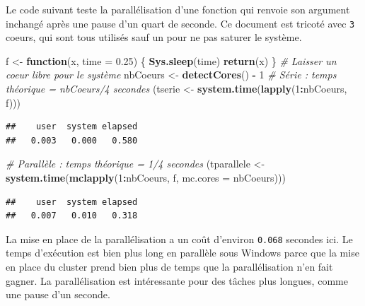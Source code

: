 \documentclass[
  12pt,
  french,
  a4paper,
  extrafontsizes,onecolumn,openright
  ]{memoir}
\newenvironment{Shaded}{\begin{snugshade}}{\end{snugshade}}
\newcommand{\CommentTok}[1]{\textcolor[rgb]{0.56,0.35,0.01}{\textit{#1}}}
\newcommand{\ControlFlowTok}[1]{\textcolor[rgb]{0.13,0.29,0.53}{\textbf{#1}}}
\newcommand{\DataTypeTok}[1]{\textcolor[rgb]{0.13,0.29,0.53}{#1}}
\newcommand{\DecValTok}[1]{\textcolor[rgb]{0.00,0.00,0.81}{#1}}
\newcommand{\FloatTok}[1]{\textcolor[rgb]{0.00,0.00,0.81}{#1}}
\newcommand{\KeywordTok}[1]{\textcolor[rgb]{0.13,0.29,0.53}{\textbf{#1}}}
\newcommand{\NormalTok}[1]{#1}
\newcommand{\OperatorTok}[1]{\textcolor[rgb]{0.81,0.36,0.00}{\textbf{#1}}}
\newcommand{\StringTok}[1]{\textcolor[rgb]{0.31,0.60,0.02}{#1}}
\begin{document}
\normalsize

Le code suivant teste la parallélisation d'une fonction qui renvoie son argument inchangé après une pause d'un quart de seconde.
Ce document est tricoté avec \texttt{3} coeurs, qui sont tous utilisés sauf un pour ne pas saturer le système.

\scriptsize

\begin{Shaded}
\begin{Highlighting}[]
\NormalTok{f <-}\StringTok{ }\ControlFlowTok{function}\NormalTok{(x, }\DataTypeTok{time =} \FloatTok{0.25}\NormalTok{) \{}
    \KeywordTok{Sys.sleep}\NormalTok{(time)}
    \KeywordTok{return}\NormalTok{(x)}
\NormalTok{\}}
\CommentTok{# Laisser un coeur libre pour le système}
\NormalTok{nbCoeurs <-}\StringTok{ }\KeywordTok{detectCores}\NormalTok{() }\OperatorTok{-}\StringTok{ }\DecValTok{1}
\CommentTok{# Série : temps théorique = nbCoeurs/4 secondes}
\NormalTok{(tserie <-}\StringTok{ }\KeywordTok{system.time}\NormalTok{(}\KeywordTok{lapply}\NormalTok{(}\DecValTok{1}\OperatorTok{:}\NormalTok{nbCoeurs, f)))}
\end{Highlighting}
\end{Shaded}

\begin{verbatim}
##    user  system elapsed 
##   0.003   0.000   0.580
\end{verbatim}

\begin{Shaded}
\begin{Highlighting}[]
\CommentTok{# Parallèle : temps théorique = 1/4 secondes}
\NormalTok{(tparallele <-}\StringTok{ }\KeywordTok{system.time}\NormalTok{(}\KeywordTok{mclapply}\NormalTok{(}\DecValTok{1}\OperatorTok{:}\NormalTok{nbCoeurs, f, }\DataTypeTok{mc.cores =}\NormalTok{ nbCoeurs)))}
\end{Highlighting}
\end{Shaded}

\begin{verbatim}
##    user  system elapsed 
##   0.007   0.010   0.318
\end{verbatim}

\normalsize

La mise en place de la parallélisation a un coût d'environ \texttt{0.068} secondes ici.
Le temps d'exécution est bien plus long en parallèle sous Windows parce que la mise en place du cluster prend bien plus de temps que la parallélisation n'en fait gagner.
La parallélisation est intéressante pour des tâches plus longues, comme une pause d'un seconde.
\end{document}
